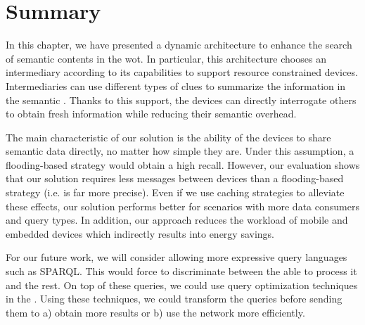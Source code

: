 \section{Summary}
\label{sec:search_summary}

In this chapter, we have presented a dynamic architecture to enhance the search of semantic contents in the \acl{wot}.
In particular, this architecture chooses an intermediary according to its capabilities to support resource constrained devices.
Intermediaries can use different types of clues to summarize the information in the semantic \Space{}.
Thanks to this support, the devices can directly interrogate others to obtain fresh information while reducing their semantic overhead.

The main characteristic of our solution is the ability of the devices to share semantic data directly, no matter how simple they are. %
Under this assumption, a flooding-based strategy would obtain a high recall. %
However, our evaluation shows that our solution requires less messages between devices than a flooding-based strategy (i.e. is far more precise).
Even if we use caching strategies to alleviate these effects, our solution performs better for scenarios with more data consumers and query types.
In addition, our approach reduces the workload of mobile and embedded devices which indirectly results into energy savings.

For our future work, we will consider allowing more expressive query languages such as SPARQL. %
This would force \consumers{} to discriminate between the \providers{} able to process it and the rest.
On top of these queries, we could use query optimization techniques in the \consumers{} \citep{schwarte_fedx_optimization_2011}.
Using these techniques, we could transform the queries before sending them to a) obtain more results or b) use the network more efficiently.